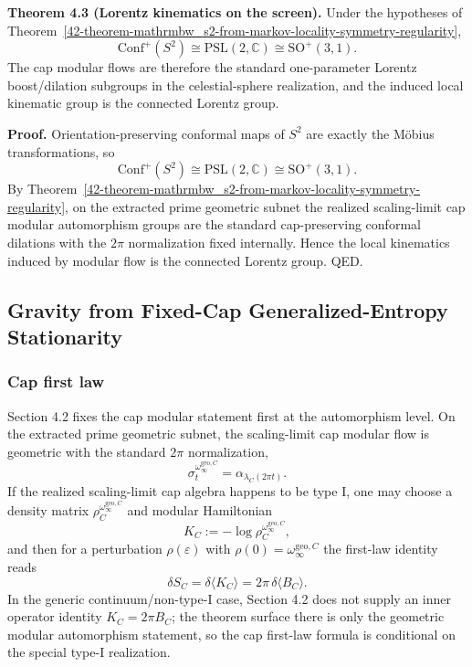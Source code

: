 \textbf{Theorem 4.3 (Lorentz kinematics on the screen).} Under the hypotheses of Theorem~\ref{42-theorem-mathrmbw_s2-from-markov-locality-symmetry-regularity},
\[
\mathrm{Conf}^+(S^2)\cong \mathrm{PSL}(2,\mathbb C)\cong \mathrm{SO}^+(3,1).
\]
The cap modular flows are therefore the standard one-parameter Lorentz boost/dilation subgroups in the celestial-sphere realization, and the induced local kinematic group is the connected Lorentz group.

\textbf{Proof.} Orientation-preserving conformal maps of \(S^2\) are exactly the M\"obius transformations, so
\[
\mathrm{Conf}^+(S^2)\cong \mathrm{PSL}(2,\mathbb C)\cong \mathrm{SO}^+(3,1).
\]
By Theorem~\ref{42-theorem-mathrmbw_s2-from-markov-locality-symmetry-regularity}, on the extracted prime geometric subnet the realized scaling-limit cap modular automorphism groups are the standard cap-preserving conformal dilations with the \(2\pi\) normalization fixed internally. Hence the local kinematics induced by modular flow is the connected Lorentz group. QED.
\subsection{Gravity from Fixed-Cap Generalized-Entropy Stationarity}\label{5-gravity-from-entanglement-equilibrium}

\subsubsection{Cap first law}\label{51-cap-first-law}

Section 4.2 fixes the cap modular statement first at the automorphism level. On the extracted prime geometric subnet, the scaling-limit cap modular flow is geometric with the standard \(2\pi\) normalization,
\[
\sigma_t^{\omega_\infty^{\mathrm{geo},C}}
=
\alpha_{\lambda_C(2\pi t)}.
\]
If the realized scaling-limit cap algebra happens to be type I, one may choose a density matrix \(\rho_C^{\omega_\infty^{\mathrm{geo},C}}\) and modular Hamiltonian
\[
K_C:=-\log\rho_C^{\omega_\infty^{\mathrm{geo},C}},
\]
and then for a perturbation \(\rho(\varepsilon)\) with \(\rho(0)=\omega_\infty^{\mathrm{geo},C}\) the first-law identity reads
\[
\delta S_C=\delta\langle K_C\rangle
=
2\pi\,\delta\langle B_C\rangle.
\]
In the generic continuum/non-type-I case, Section 4.2 does not supply an inner operator identity \(K_C=2\pi B_C\); the theorem surface there is only the geometric modular automorphism statement, so the cap first-law formula is conditional on the special type-I realization.

